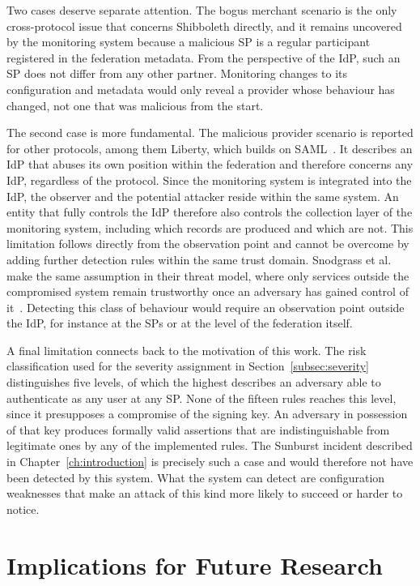 \documentclass[../main.tex]{subfiles}
\begin{document}
Two cases deserve separate attention. 
The bogus merchant scenario is the only cross-protocol issue that concerns Shibboleth directly, and 
it remains uncovered by the monitoring system because a malicious SP is a regular participant registered 
in the federation metadata. 
From the perspective of the IdP, such an SP does not differ from any other partner. 
Monitoring changes to its configuration and metadata would only reveal a provider whose behaviour has 
changed, not one that was malicious from the start. 

The second case is more fundamental. 
The malicious provider scenario is reported for other protocols, among them Liberty, which builds 
on SAML~\cite{FIMSurvey}. 
It describes an IdP that abuses its own position within the federation and therefore concerns 
any IdP, regardless of the protocol. 
Since the monitoring system is integrated into the IdP, the observer and the potential attacker 
reside within the same system. 
An entity that fully controls the IdP therefore also controls the collection layer of the 
monitoring system, including which records are produced and which are not. 
This limitation follows directly from the observation point and cannot be overcome by adding 
further detection rules within the same trust domain. 
Snodgrass et al. make the same assumption in their threat model, where only services outside the 
compromised system remain trustworthy once an adversary has gained control of 
it~\cite{TamperDetection}. 
Detecting this class of behaviour would require an observation point outside the IdP, for instance 
at the SPs or at the level of the federation itself. 

A final limitation connects back to the motivation of this work. 
The risk classification used for the severity assignment in Section~\ref{subsec:severity} 
distinguishes five levels, of which the highest describes an adversary able to authenticate as any 
user at any SP. 
None of the fifteen rules reaches this level, since it presupposes a compromise of the signing key. 
An adversary in possession of that key produces formally valid assertions that are 
indistinguishable from legitimate ones by any of the implemented rules. 
The Sunburst incident described in Chapter~\ref{ch:introduction} is precisely such a case and 
would therefore not have been detected by this system. 
What the system can detect are configuration weaknesses that make an attack of this kind more 
likely to succeed or harder to notice. 

\section{Implications for Future Research}\label{sec:implication}
\end{document}
